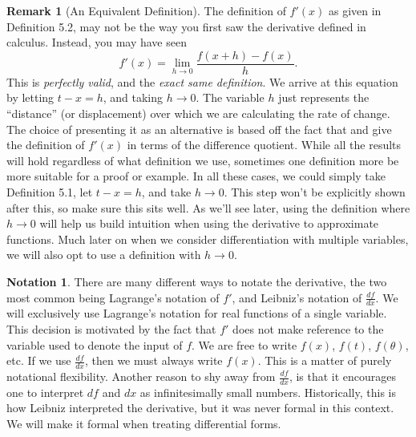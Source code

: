 \documentclass{article}
\theoremstyle{definition}
\newtheorem{note}{Notation}[section]
\newtheorem{remark}{Remark}[section]
\begin{document}
\begin{remark}[An Equivalent Definition]
	The definition of $ f'(x) $ as given in Definition 5.2, may not be the way you first saw the derivative defined in calculus. Instead, you may have seen $$f'(x)=\lim\limits_{h\to 0}\frac{f(x+h)-f(x)}{h} .$$ This is \textit{perfectly valid}, and the \textit{exact same definition}. We arrive at this equation by letting $ t-x=h $, and taking $ h\to 0 $. The variable $ h $ just represents the ``distance'' (or displacement) over which we are calculating the rate of change. The choice of presenting it as an alternative is based off the fact that \cite{rudin1964principles} and \cite{tao2006analysis} give the definition of $ f'(x) $ in terms of the difference quotient. While all the results will hold regardless of what definition we use, sometimes one definition more be more suitable for a proof or example. In all these cases, we could simply take Definition 5.1, let $ t-x=h $, and take $ h\to 0 $. This step won't be explicitly shown after this, so make sure this sits well. As we'll see later, using the definition where $ h\to 0 $ will help us build intuition when using the derivative to approximate functions. Much later on when we consider differentiation with multiple variables, we will also opt to use a definition with $ h\to 0 $.
\end{remark}
\begin{note}
	There are many different ways to notate the derivative, the two most common being Lagrange's notation of $ f' $, and Leibniz's notation of $ \frac{df}{dx} $. We will exclusively use Lagrange's notation for real functions of a single variable. This decision is motivated by the fact that $ f' $ does not make reference to the variable used to denote the input of $ f $. We are free to write $ f(x) $, $ f(t) $, $ f(\theta) $, etc. If we use $ \frac{df}{dx} $, then we must always write $ f(x) $. This is a matter of purely notational flexibility. Another reason to shy away from $ \frac{df}{dx} $, is that it encourages one to interpret $ df $ and $ dx $ as infinitesimally small numbers. Historically, this is how Leibniz interpreted the derivative, but it was never formal in this context. We will make it formal when treating differential forms. 
\end{note}
\end{document}
